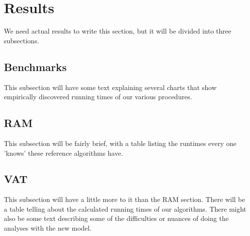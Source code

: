 \section{Results}

  We need actual results to write this section, but it will be divided into
  three subsections.

  \subsection{Benchmarks}
     This subsection will have some text explaining several charts that show
     empirically discovered running times of our various procedures.

  \subsection{RAM}
     This subsection will be fairly brief, with a table listing the runtimes
     every one 'knows' these reference algorithms have.

  \subsection{VAT}
     This subsection will have a little more to it than the RAM section. There
     will be a table telling about the calculated running times of our 
     algorithms. There might also be some text describing some of the 
     difficulties or nuances of doing the analyses with the new model.
